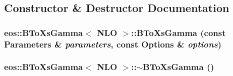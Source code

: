 \subsection{Constructor \& Destructor Documentation}
\hypertarget{classeos_1_1BToXsGamma_3_01NLO_01_4_a30c96f4eb1b642661414f1d87e730ee3}{
\subsubsection[{BToXsGamma}]{\setlength{\rightskip}{0pt plus 5cm}eos::BToXsGamma$<$ {\bf NLO} $>$::BToXsGamma (const {\bf Parameters} \& {\em parameters}, \/  const {\bf Options} \& {\em options})}}
\label{classeos_1_1BToXsGamma_3_01NLO_01_4_a30c96f4eb1b642661414f1d87e730ee3}
\hypertarget{classeos_1_1BToXsGamma_3_01NLO_01_4_a992dc782baee80b815710a151c54f532}{
\subsubsection[{$\sim$BToXsGamma}]{\setlength{\rightskip}{0pt plus 5cm}eos::BToXsGamma$<$ {\bf NLO} $>$::$\sim$BToXsGamma ()}}
\label{classeos_1_1BToXsGamma_3_01NLO_01_4_a992dc782baee80b815710a151c54f532}


